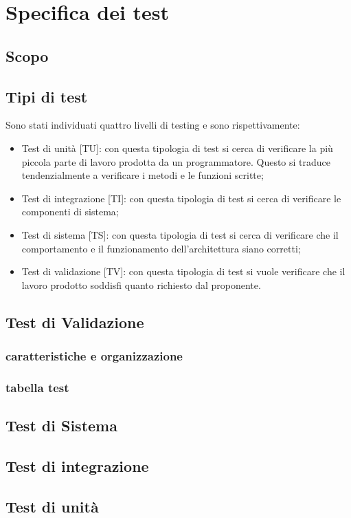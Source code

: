 \documentclass[PianoDiProgetto.tex]{subfiles}
\begin{document}
\chapter{Specifica dei test}

\section{Scopo}

\section{Tipi di test}
Sono stati individuati quattro livelli di testing e sono rispettivamente:
\begin{itemize}
	
	\item Test di unità [TU]: con questa tipologia di test si cerca di verificare la più piccola parte di lavoro prodotta da un programmatore. Questo si traduce tendenzialmente a verificare i metodi e le funzioni scritte;
	
	\item Test di integrazione [TI]: con questa tipologia di test si cerca di verificare le componenti
	di sistema;
	
	\item Test di sistema [TS]: con questa tipologia di test si cerca di verificare che il comportamento e il funzionamento dell’architettura siano corretti;
	
	\item Test di validazione [TV]: con questa tipologia di test si vuole verificare che il lavoro prodotto soddisfi quanto richiesto dal proponente.

\end{itemize}

\section{Test di Validazione}
	\subsection{caratteristiche e organizzazione}
	\subsection{tabella test}
	
\section{Test di Sistema}
	
\section{Test di integrazione}

\section{Test di unità}	
	
\end{document}
